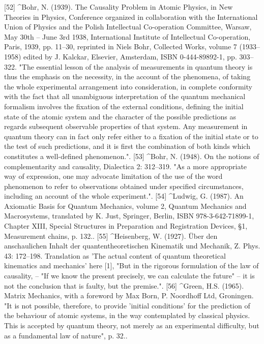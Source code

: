 [52]
^Bohr, N. (1939). The Causality Problem in Atomic Physics, in New Theories in Physics, Conference organized in collaboration with the International Union of Physics and the Polish Intellectual Co-operation Committee, Warsaw, May 30th – June 3rd 1938, International Institute of Intellectual Co-operation, Paris, 1939, pp. 11–30, reprinted in Niels Bohr, Collected Works, volume 7 (1933–1958) edited by J. Kalckar, Elsevier, Amsterdam, ISBN 0-444-89892-1, pp. 303–322. "The essential lesson of the analysis of measurements in quantum theory is thus the emphasis on the necessity, in the account of the phenomena, of taking the whole experimental arrangement into consideration, in complete conformity with the fact that all unambiguous interpretation of the quantum mechanical formalism involves the fixation of the external conditions, defining the initial state of the atomic system and the character of the possible predictions as regards subsequent observable properties of that system. Any measurement in quantum theory can in fact only refer either to a fixation of the initial state or to the test of such predictions, and it is first the combination of both kinds which constitutes a well-defined phenomenon.".
[53]
^Bohr, N. (1948). On the notions of complementarity and causality, Dialectica 2: 312–319. "As a more appropriate way of expression, one may advocate limitation of the use of the word phenomenon to refer to observations obtained under specified circumstances, including an account of the whole experiment.".
[54]
^Ludwig, G. (1987). An Axiomatic Basis for Quantum Mechanics, volume 2, Quantum Mechanics and Macrosystems, translated by K. Just, Springer, Berlin, ISBN 978-3-642-71899-1, Chapter XIII, Special Structures in Preparation and Registration Devices, §1, Measurement chains, p. 132..
[55]
^Heisenberg, W. (1927). Über den anschaulichen Inhalt der quantentheoretischen Kinematik und Mechanik, Z. Phys. 43: 172–198. Translation as 'The actual content of quantum theoretical kinematics and mechanics' here [1], "But in the rigorous formulation of the law of causality, – "If we know the present precisely, we can calculate the future" – it is not the conclusion that is faulty, but the premise.".
[56]
^Green, H.S. (1965). Matrix Mechanics, with a foreword by Max Born, P. Noordhoff Ltd, Groningen. "It is not possible, therefore, to provide 'initial conditions' for the prediction of the behaviour of atomic systems, in the way contemplated by classical physics. This is accepted by quantum theory, not merely as an experimental difficulty, but as a fundamental law of nature", p. 32..
